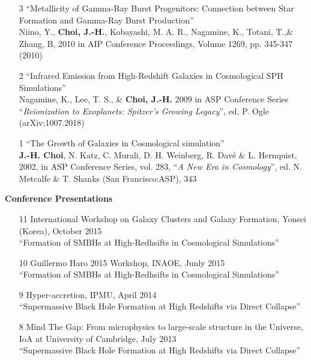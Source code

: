 \documentclass [11pt]{article}
\begin{document}
{{\begin{enumerate}
\item[3]``Metallicity of Gamma-Ray Burst Progenitors: Connection between Star Formation and Gamma-Ray Burst Production''\\ Niino, Y., \textbf{Choi, J.-H.}, Kobayashi, M. A. R., Nagamine, K., Totani, T.,\& Zhang, B, 2010 in AIP Conference Proceedings, Volume 1269, pp. 345-347 (2010)

\item[2]``Infrared Emission from High-Redshift Galaxies in Cosmological SPH Simulations''\\ Nagamine, K., Lee, T. S., \& \textbf{Choi, J.-H.} 2009 in ASP Conference Series ``\emph{Reionization to Exoplanets: Spitzer's Growing Legacy}'', ed. P. Ogle (arXiv:1007.2018) 

\item[1]``The Growth of Galaxies in Cosmological simulation'' \\  \textbf{J.-H. Choi}, N. Katz, C. Murali, D. H. Weinberg, R. Dav\'{e} \& L. Hernquist, 2002, in ASP Conference Series, vol. 283, ``\emph{A New Era in Cosmology}'', ed. N. Metcalfe \& T. Shanks (San Francisco:ASP), 343

\end{enumerate}


\noindent
{\textbf{Conference Presentations}}
\begin{enumerate}

\item[11] International Workshop on Galaxy Clusters and Galaxy Formation, Yonsei (Korea), October 2015\\ ``Formation of SMBHs at High-Redhsifts in Cosmological Simulations''

\item[10] Guillermo Haro 2015 Workshop, INAOE, Junly 2015\\ ``Formation of SMBHs at High-Redhsifts in Cosmological Simulations''

\item[9] Hyper-accretion, IPMU, April 2014\\ ``Supermassive Black Hole Formation at High Redshifts via Direct Collapse''

\item[8] Mind The Gap: From microphysics to large-scale structure in the Universe, IoA at University of Cambridge, July 2013\\ ``Supermassive Black Hole Formation at High Redshifts via Direct Collapse''


\end{enumerate}}}
\end{document}
